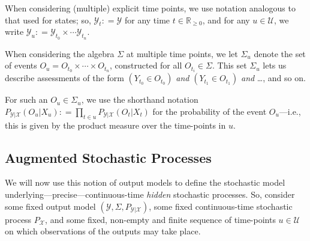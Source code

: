 \documentclass[twoside,11pt]{article}
\newcommand{\reals}{\mathbb{R}}
\newcommand{\realsnonneg}{\reals_{\geq 0}}
\newcommand{\states}{\mathcal{X}}
\newcommand{\observs}{\mathcal{Y}}
\newcommand{\coloneqq}{:\!=}
\begin{document}
When considering (multiple) explicit time points, we use notation analogous to that used for states; so, $\observs_t\coloneqq\observs$ for any time $t\in\realsnonneg$, and for any $u\in\mathcal{U}$, we write $\observs_u\coloneqq \observs_{t_0}\times\cdots\observs_{t_n}$. 

When considering the algebra $\Sigma$ at multiple time points, we let $\Sigma_u$ denote the set of events $O_u=O_{t_0}\times\cdots\times O_{t_n}$, constructed for all $O_{t_i}\in\Sigma$. %
This set $\Sigma_u$ lets us describe assessments of the form $(Y_{t_0}\in O_{t_0})$ \emph{and} $(Y_{t_1}\in O_{t_1})$ \emph{and} \ldots, and so on.  

For such an $O_u\in\Sigma_u$, we use the shorthand notation $P_{\observs\vert\states}(O_u\vert X_u)\coloneqq \prod_{t\in u}P_{\observs\vert\states}(O_t\vert X_t)$ for the probability of the event $O_u$---i.e., this is given by the product measure over the time-points in $u$.


\subsection{Augmented Stochastic Processes}\label{sec:aug_stochastic_processes}
We will now use this notion of output models to define the stochastic model underlying---precise---continuous-time \emph{hidden} stochastic processes. 
So, consider some fixed output model $(\observs,\Sigma,P_{\observs\vert\states})$, some fixed continuous-time stochastic process $P_\states$, and some fixed, non-empty and finite sequence of time-points $u\in\mathcal{U}$ on which observations of the outputs may take place. %
\end{document}
